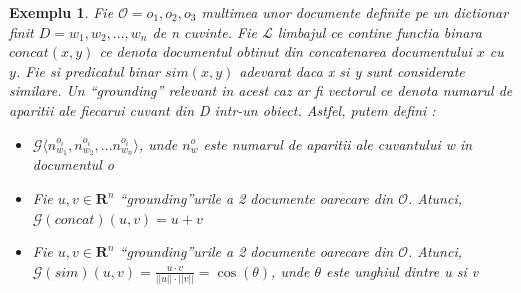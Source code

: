 \documentclass{article}
\newtheorem{example}{Exemplu}[section]
\begin{document}
\begin{example}
Fie $\mathcal{O} = {o_1,o_2, o_3}$ multimea unor documente definite pe un dictionar finit $D = {w_1, w_2, ..., w_n}$ de n cuvinte. Fie $\mathcal{L}$ limbajul ce contine functia binara $concat(x, y)$  ce denota documentul obtinut din concatenarea documentului $x$ cu $y$. Fie si predicatul binar $sim(x, y)$ adevarat daca x si y sunt considerate similare. Un ``grounding'' relevant in acest caz ar fi vectorul ce denota numarul de aparitii ale fiecarui cuvant din D intr-un obiect. Astfel, putem defini \cite{LTN}:\\
\begin{itemize}
	\item $\mathcal{G}\langle n_{w_1}^{o_i}, n_{w_2}^{o_i}, ... n_{w_n}^{o_i}\rangle$, unde $n_{w}^{o}$ este numarul de aparitii ale cuvantului w in documentul o
	\item Fie $u, v \in \mathbf{R}^n$ ``grounding''urile a 2 documente oarecare din $\mathcal{O}$. Atunci, $\mathcal{G}(concat)(u, v) = u + v$
	\item Fie $u, v \in \mathbf{R}^n$ ``grounding''urile a 2 documente oarecare din $\mathcal{O}$. Atunci, $\mathcal{G}(sim)(u, v) = \frac{u \cdot v}{||u|| \cdot ||v||} =\cos(\theta)$, unde $\theta$ este unghiul dintre u si v
\end{itemize}


\end{example}
\end{document}
